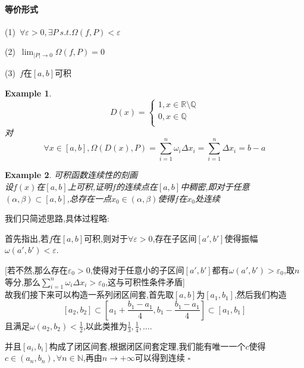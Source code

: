 \documentclass[11pt,hyperref,a4paper,UTF8]{ctexart}
\newtheorem{example}{Example}[subsection]
\newenvironment{cproof}{%
\heiti{证明}\kaishu
}{%
  \hfill $\square$
  \par\bigskip
}
\newcommand{\RR}{\mathbb{R}}
\newcommand{\NN}{\mathbb{N}}
\begin{document}
\begin{CJK}{UTF8}{gkai}
\paragraph{等价形式}

(1)~$\forall \varepsilon > 0,\exists P ~s.t. \Omega(f,P) < \varepsilon$

(2)~$\lim_{|P|\to 0} \Omega(f,P) = 0$

(3)~$f\text{在}[a,b]\text{可积}$\\

\begin{example}
  \begin{equation*}
    D(x) = 
    \begin{cases}
      1,x\in \RR\setminus \mathbb{Q}\\
      0,x\in\mathbb{Q}\\
    \end{cases}
  \end{equation*}
对\[\forall x \in [a,b],\Omega(D(x),P) = \sum_{i = 1}^{n} \omega_i \Delta x_i = \sum_{i = 1}^{n}\Delta x_i = b - a\]
\end{example}

\begin{example}
  可积函数连续性的刻画\\

  设$f(x)$在$[a,b]$上可积,证明$f$的连续点在$[a,b]$中稠密,即对于任意$(\alpha,\beta) \subset [a,b]$,总存在一点$x_0 \in (\alpha,\beta)$使得$f$在$x_0$处连续
\end{example}

\begin{cproof}
  我们只简述思路,具体过程略:

  首先指出,若$f$在$[a,b]$可积,则对于$\forall \varepsilon > 0$,存在子区间$[a',b']$使得振幅$\omega(a',b') < \varepsilon$.

  [若不然,那么存在$\varepsilon_0 > 0$,使得对于任意小的子区间$[a',b']$都有$\omega(a',b') > \varepsilon_0$,取$n$等分,那么$\sum_{i = 1}^{n}\omega_i \Delta x_i > \varepsilon_0$,这与可积性条件矛盾]\\

  故我们接下来可以构造一系列闭区间套,首先取$[a,b]$为$[a_1,b_1]$,然后我们构造
  \[[a_2,b_2] \subset \left[a_1 + \frac{b_1 - a_1}{4} , b_1 - \frac{b_1 - a_1}{4}\right] \subset [a_1,b_1]\]
  且满足$\omega(a_2,b_2) < \frac{1}{2}$,以此类推为$\frac{1}{3},\frac{1}{4},\ldots$.

  并且$[a_i,b_i]$构成了闭区间套,根据闭区间套定理,我们能有唯一一个$c$使得$c \in (a_n,b_n),\forall n \in \NN$,再由$n \to +\infty$可以得到连续
\end{cproof}


\end{CJK}
\end{document}

